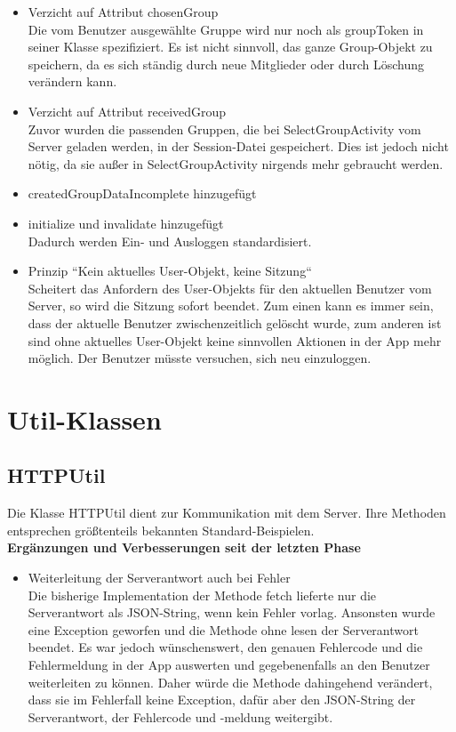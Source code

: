 \documentclass[a4paper]{scrreprt}
\begin{document}
\begin{itemize}
\item Verzicht auf Attribut chosenGroup \\
Die vom Benutzer ausgewählte Gruppe wird nur noch als groupToken in seiner Klasse spezifiziert. Es ist nicht sinnvoll, das ganze Group-Objekt zu speichern, da es sich ständig durch neue Mitglieder oder durch Löschung verändern kann. 
\item Verzicht auf Attribut receivedGroup \\
Zuvor wurden die passenden Gruppen, die bei SelectGroupActivity vom Server geladen werden, in der Session-Datei gespeichert. Dies ist jedoch nicht nötig, da sie außer in SelectGroupActivity nirgends mehr gebraucht werden.
\item createdGroupDataIncomplete hinzugefügt
\item initialize und invalidate hinzugefügt \\
Dadurch werden Ein- und Ausloggen standardisiert.
\item Prinzip “Kein aktuelles User-Objekt, keine Sitzung“ \\
Scheitert das Anfordern des User-Objekts für den aktuellen Benutzer vom Server, so wird die Sitzung sofort beendet. Zum einen kann es immer sein, dass der aktuelle Benutzer zwischenzeitlich gelöscht wurde, zum anderen ist sind ohne aktuelles User-Objekt keine sinnvollen Aktionen in der App mehr möglich. Der Benutzer müsste versuchen, sich neu einzuloggen.

\end{itemize}

\section{Util-Klassen}

\subsection{HTTPUtil}
Die Klasse HTTPUtil dient zur Kommunikation mit dem Server. Ihre Methoden entsprechen größtenteils bekannten Standard-Beispielen. \\
\textbf{Ergänzungen und Verbesserungen seit der letzten Phase} \\
\begin{itemize}
\item Weiterleitung der Serverantwort auch bei Fehler \\
Die bisherige Implementation der Methode fetch lieferte nur die Serverantwort als JSON-String, wenn kein Fehler vorlag. Ansonsten wurde eine Exception geworfen und die Methode ohne lesen der Serverantwort beendet. Es war jedoch wünschenswert, den genauen Fehlercode und die Fehlermeldung in der App auswerten und gegebenenfalls an den Benutzer weiterleiten zu können. Daher würde die Methode dahingehend verändert, dass sie im Fehlerfall keine Exception, dafür aber den JSON-String der Serverantwort, der Fehlercode und -meldung weitergibt.
\end{itemize}
\end{document}
